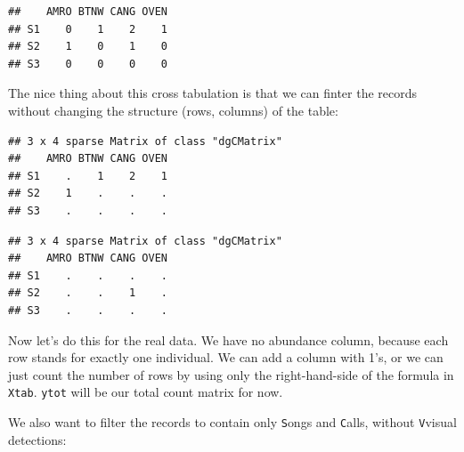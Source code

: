 \documentclass[12pt,]{book}
\newenvironment{Shaded}{\begin{snugshade}}{\end{snugshade}}
\newcommand{\DataTypeTok}[1]{\textcolor[rgb]{0.13,0.29,0.53}{#1}}
\newcommand{\KeywordTok}[1]{\textcolor[rgb]{0.13,0.29,0.53}{\textbf{#1}}}
\newcommand{\NormalTok}[1]{#1}
\newcommand{\OperatorTok}[1]{\textcolor[rgb]{0.81,0.36,0.00}{\textbf{#1}}}
\newcommand{\StringTok}[1]{\textcolor[rgb]{0.31,0.60,0.02}{#1}}
\begin{document}
\begin{verbatim}
##    AMRO BTNW CANG OVEN
## S1    0    1    2    1
## S2    1    0    1    0
## S3    0    0    0    0
\end{verbatim}

The nice thing about this cross tabulation is that we can finter the records without
changing the structure (rows, columns) of the table:

\begin{Shaded}
\end{Shaded}

\begin{verbatim}
## 3 x 4 sparse Matrix of class "dgCMatrix"
##    AMRO BTNW CANG OVEN
## S1    .    1    2    1
## S2    1    .    .    .
## S3    .    .    .    .
\end{verbatim}

\begin{Shaded}
\end{Shaded}

\begin{verbatim}
## 3 x 4 sparse Matrix of class "dgCMatrix"
##    AMRO BTNW CANG OVEN
## S1    .    .    .    .
## S2    .    .    1    .
## S3    .    .    .    .
\end{verbatim}

Now let's do this for the real data. We have no abundance column, because
each row stands for exactly one individual. We can add a column with 1's,
or we can just count the number of rows by using only the right-hand-side of the
formula in \texttt{Xtab}. \texttt{ytot} will be our total count matrix for now.

We also want to filter the records to contain only \texttt{S}ongs and \texttt{C}alls, without
\texttt{V}visual detections:

\begin{Shaded}
\end{Shaded}
\end{document}
